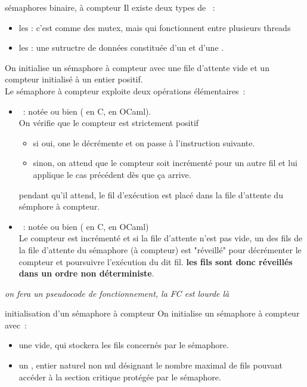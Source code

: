 \begin{adjustwidth}{-3cm}{-3cm}
\begin{definition}{}{sémaphores binaire, à compteur}
    Il existe deux types de ~:
    \begin{itemize}
        \item les  : c'est comme des mutex, mais qui fonctionnent entre plusieurs threads
        \item les  : une sutructre de données constituée d'un  et d'une .
    \end{itemize}
    On initialise un sémaphore à compteur avec une file d'attente vide et un compteur initialisé à un entier positif.\\
    Le sémaphore à compteur exploite deux opérations élémentaires~:
    \begin{itemize}
        \item {}~: notée  ou bien  ( en C,  en OCaml).\\
            On vérifie que le compteur est strictement positif~
            \begin{itemize}
                \item si oui, one le décrémente et on passe à l'instruction suivante.
                \item sinon, on attend que le compteur soit incrémenté pour un autre fil et lui applique le cas précédent dès que ça arrive.
            \end{itemize}
            pendant qu'il attend, le fil d'exécution est placé dans la file d'attente du sémphore à compteur.
            \item {}~: notée  ou bien  ( en C,  en OCaml)\\
            Le compteur est incrémenté et si la file d'attente n'est pas vide, un des fils de la file d'attente du sémaphore (à compteur) est "réveillé" pour décrémenter le compteur et poursuivre l'exécution du dit fil. \textbf{les fils sont donc réveillés dans un ordre non déterministe}.
    \end{itemize}
    \textit{on fera un pseudocode de fonctionnement, la FC est lourde là}
\end{definition}

\begin{definition}{}{initialisation d'un sémaphore à compteur}
    On initialise un sémaphore à compteur avec~:
    \begin{itemize}
        \item une  vide, qui stockera les fils concernés par le sémaphore.
        \item un , entier naturel non nul désignant le nombre maximal de fils pouvant accéder à la section critique protégée par le sémaphore.
    \end{itemize}
\end{definition}


\end{adjustwidth}
